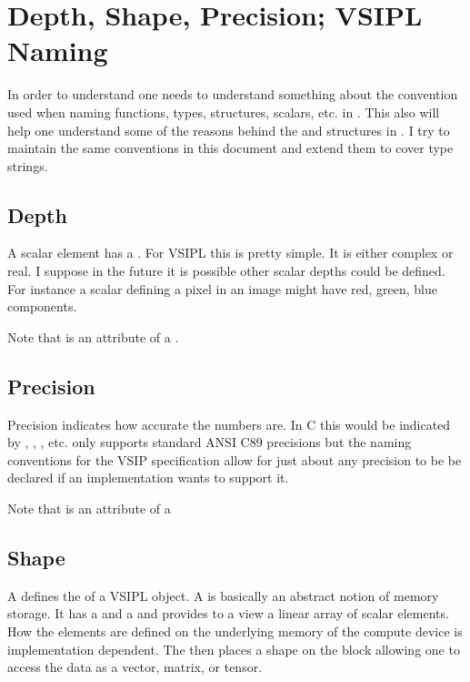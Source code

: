 \clearpage
\section*{Depth, Shape, Precision; VSIPL Naming}
In order to understand \cvl one needs to understand something about the convention used when naming functions, types, structures, scalars, etc. in \cvl. This also will help one understand some of the reasons behind the  and  structures in \cvl. I try to maintain the same conventions in this document and extend them to cover \pyjv type strings.
%
\subsection*{Depth}
A scalar element has a .  For VSIPL this is pretty simple.  It is either complex or real. I suppose in the future it is possible other scalar depths could be defined. For instance a scalar defining a pixel in an image might have red, green, blue components. 

Note that  is an attribute of a . 
%
\subsection*{Precision}
Precision indicates how accurate the numbers are. In C this would be indicated by , , , etc. \jv only supports standard ANSI C89 precisions but the naming conventions for the VSIP specification allow for just about any precision to be be declared if an implementation wants to support it.

Note that  is an attribute of a 
%
\subsection*{Shape}
A  defines the  of a VSIPL object. A  is basically an abstract notion of memory storage. It has a  and a  and provides to a view a linear array of scalar elements.  How the elements are defined on the underlying memory of the compute device is implementation dependent. The  then places a shape on the block allowing one to access the data as a vector, matrix, or tensor. 

